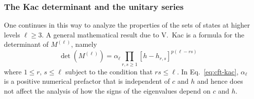 \subsubsection*{The Kac determinant and the unitary series}

One continues in this way to analyze the properties of the sets of states at higher levels $\ell\ge3$. A general
mathematical result due to V.~Kac is a formula for the determinant of $M^{(\ell)}$, namely
\begin{equation}\label{eq:cft-kac}
  \det(M^{(\ell)}) = \alpha_\ell\prod_{r,s\ge1}[h-h_{r,s}]^{p(\ell-rs)}
\end{equation}
where $1\le r,\,s\le\ell$ subject to the condition that $rs\le\ell$. In Eq.~\eqref{eq:cft-kac}, $\alpha_\ell$ is a
positive numerical prefactor that is independent of $c$ and $h$ and hence does not affect the analysis of how the
signs of the eigenvalues depend on $c$ and $h$.

